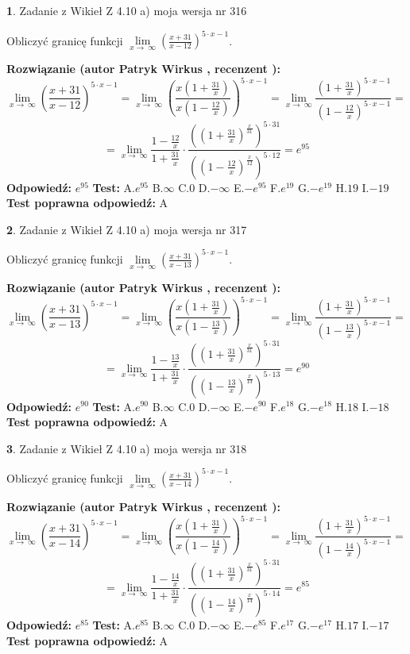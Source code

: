 \documentclass[12pt, a4paper]{article}
\theoremstyle{definition} %
\newtheorem{zad}{}
\newcommand{\zadStart}[1]{\begin{zad}#1\newline}
\newcommand{\zadStop}{\end{zad}}
\newcommand{\rozwStart}[2]{\noindent \textbf{Rozwiązanie (autor #1 , recenzent #2): }\newline}
\newcommand{\rozwStop}{\newline}
\newcommand{\odpStart}{\noindent \textbf{Odpowiedź:}\newline}
\newcommand{\odpStop}{\newline}
\newcommand{\testStart}{\noindent \textbf{Test:}\newline}
\newcommand{\testStop}{\newline}
\newcommand{\kluczStart}{\noindent \textbf{Test poprawna odpowiedź:}\newline}
\newcommand{\kluczStop}{\newline}
\begin{document}
\zadStart{Zadanie z Wikieł Z 4.10 a) moja wersja nr 316}

Obliczyć granicę funkcji  $\lim\limits_{x\to\ \infty}(\frac{x+31}{x-12})^{5\cdot x-1}$.
\zadStop
\rozwStart{Patryk Wirkus}{}
$$\lim\limits_{x\to\ \infty}(\frac{x+31}{x-12})^{5\cdot x-1} = \lim\limits_{x\to\ \infty}(\frac{x(1+\frac{31}{x})}{x(1-\frac{12}{x})})^{5\cdot x-1}=\lim\limits_{x\to\ \infty}\frac{(1+\frac{31}{x})^{5\cdot x-1}}{(1-\frac{12}{x})^{5\cdot x-1}}=$$
$$=\lim\limits_{x\to\ \infty}\frac{1-\frac{12}{x}}{1+\frac{31}{x}}\cdot\frac{((1+\frac{31}{x})^{\frac{x}{31}})^{5\cdot31}}{((1-\frac{12}{x})^{\frac{x}{12}})^{5\cdot12}}=e^{95}$$
\rozwStop
\odpStart
$e^{95}$
\odpStop
\testStart
A.$e^{95}$ B.$\infty$ C.$0$ D.$-\infty$ E.$-e^{95}$
F.$e^{19}$ G.$-e^{19}$
H.$19$
I.$-19$
\testStop
\kluczStart
A
\kluczStop



\zadStart{Zadanie z Wikieł Z 4.10 a) moja wersja nr 317}

Obliczyć granicę funkcji  $\lim\limits_{x\to\ \infty}(\frac{x+31}{x-13})^{5\cdot x-1}$.
\zadStop
\rozwStart{Patryk Wirkus}{}
$$\lim\limits_{x\to\ \infty}(\frac{x+31}{x-13})^{5\cdot x-1} = \lim\limits_{x\to\ \infty}(\frac{x(1+\frac{31}{x})}{x(1-\frac{13}{x})})^{5\cdot x-1}=\lim\limits_{x\to\ \infty}\frac{(1+\frac{31}{x})^{5\cdot x-1}}{(1-\frac{13}{x})^{5\cdot x-1}}=$$
$$=\lim\limits_{x\to\ \infty}\frac{1-\frac{13}{x}}{1+\frac{31}{x}}\cdot\frac{((1+\frac{31}{x})^{\frac{x}{31}})^{5\cdot31}}{((1-\frac{13}{x})^{\frac{x}{13}})^{5\cdot13}}=e^{90}$$
\rozwStop
\odpStart
$e^{90}$
\odpStop
\testStart
A.$e^{90}$ B.$\infty$ C.$0$ D.$-\infty$ E.$-e^{90}$
F.$e^{18}$ G.$-e^{18}$
H.$18$
I.$-18$
\testStop
\kluczStart
A
\kluczStop



\zadStart{Zadanie z Wikieł Z 4.10 a) moja wersja nr 318}

Obliczyć granicę funkcji  $\lim\limits_{x\to\ \infty}(\frac{x+31}{x-14})^{5\cdot x-1}$.
\zadStop
\rozwStart{Patryk Wirkus}{}
$$\lim\limits_{x\to\ \infty}(\frac{x+31}{x-14})^{5\cdot x-1} = \lim\limits_{x\to\ \infty}(\frac{x(1+\frac{31}{x})}{x(1-\frac{14}{x})})^{5\cdot x-1}=\lim\limits_{x\to\ \infty}\frac{(1+\frac{31}{x})^{5\cdot x-1}}{(1-\frac{14}{x})^{5\cdot x-1}}=$$
$$=\lim\limits_{x\to\ \infty}\frac{1-\frac{14}{x}}{1+\frac{31}{x}}\cdot\frac{((1+\frac{31}{x})^{\frac{x}{31}})^{5\cdot31}}{((1-\frac{14}{x})^{\frac{x}{14}})^{5\cdot14}}=e^{85}$$
\rozwStop
\odpStart
$e^{85}$
\odpStop
\testStart
A.$e^{85}$ B.$\infty$ C.$0$ D.$-\infty$ E.$-e^{85}$
F.$e^{17}$ G.$-e^{17}$
H.$17$
I.$-17$
\testStop
\kluczStart
A
\kluczStop
\end{document}
